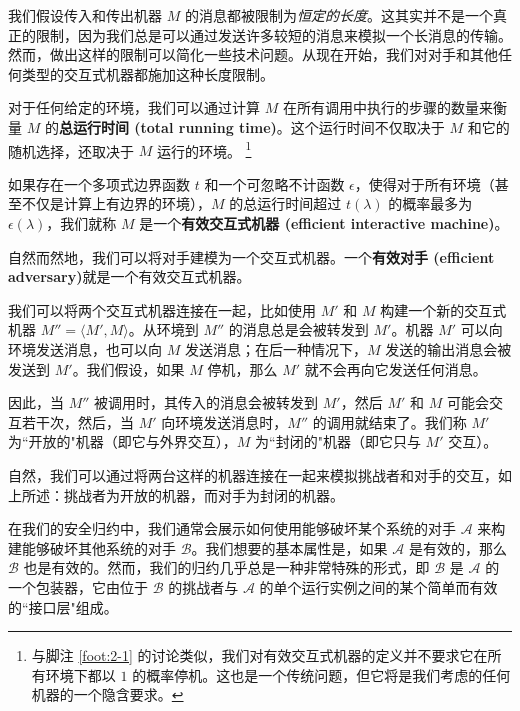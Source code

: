 我们假设传入和传出机器 $M$ 的消息都被限制为\emph{恒定的长度}。这其实并不是一个真正的限制，因为我们总是可以通过发送许多较短的消息来模拟一个长消息的传输。然而，做出这样的限制可以简化一些技术问题。从现在开始，我们对对手和其他任何类型的交互式机器都施加这种长度限制。

对于任何给定的环境，我们可以通过计算 $M$ 在所有调用中执行的步骤的数量来衡量 $M$ 的\textbf{总运行时间 (total running time)}。这个运行时间不仅取决于 $M$ 和它的随机选择，还取决于 $M$ 运行的环境。
\footnote{
与脚注 \ref{foot:2-1} 的讨论类似，我们对有效交互式机器的定义并不要求它在所有环境下都以 $1$ 的概率停机。这也是一个传统问题，但它将是我们考虑的任何机器的一个隐含要求。
}

\begin{definition}[有效交互式机器]
如果存在一个多项式边界函数 $t$ 和一个可忽略不计函数 $\epsilon$，使得对于所有环境（甚至不仅是计算上有边界的环境），$M$ 的总运行时间超过 $t(\lambda)$ 的概率最多为 $\epsilon(\lambda)$，我们就称 $M$ 是一个\textbf{有效交互式机器 (efficient interactive machine)}。
\end{definition}


自然而然地，我们可以将对手建模为一个交互式机器。一个\textbf{有效对手 (efficient adversary)}就是一个有效交互式机器。

我们可以将两个交互式机器连接在一起，比如使用 $M'$ 和 $M$ 构建一个新的交互式机器 $M''=\langle M',M\rangle$。从环境到 $M''$ 的消息总是会被转发到 $M'$。机器 $M'$ 可以向环境发送消息，也可以向 $M$ 发送消息；在后一种情况下，$M$ 发送的输出消息会被发送到 $M'$。我们假设，如果 $M$ 停机，那么 $M'$ 就不会再向它发送任何消息。

因此，当 $M''$ 被调用时，其传入的消息会被转发到 $M'$，然后 $M'$ 和 $M$ 可能会交互若干次，然后，当 $M'$ 向环境发送消息时，$M''$ 的调用就结束了。我们称 $M'$ 为``开放的"机器（即它与外界交互），$M$ 为``封闭的"机器（即它只与 $M'$ 交互）。

\vspace{8pt}

自然，我们可以通过将两台这样的机器连接在一起来模拟挑战者和对手的交互，如上所述：挑战者为开放的机器，而对手为封闭的机器。

在我们的安全归约中，我们通常会展示如何使用能够破坏某个系统的对手 $\mathcal{A}$ 来构建能够破坏其他系统的对手 $\mathcal{B}$。我们想要的基本属性是，如果 $\mathcal{A}$ 是有效的，那么 $\mathcal{B}$ 也是有效的。然而，我们的归约几乎总是一种非常特殊的形式，即 $\mathcal{B}$ 是 $\mathcal{A}$ 的一个包装器，它由位于 $\mathcal{B}$ 的挑战者与 $\mathcal{A}$ 的单个运行实例之间的某个简单而有效的``接口层"组成。

